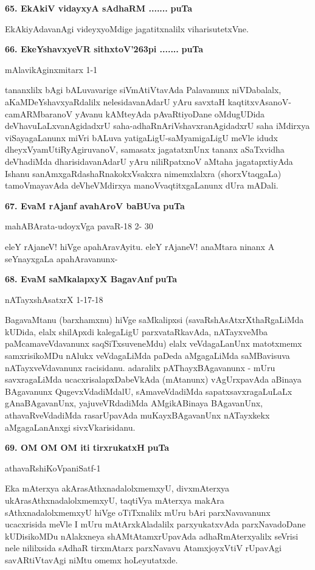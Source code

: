 \medskip
\noindent
\textbf{65. EkAkiV vidayxyA sAdhaRM .......} \hfill{\bf puTa }

\smallskip
EkAkiyAdavanAgi videyxyoMdige jagatitxnalilx viharisutetxVne.

\eject

\noindent
\textbf{66. EkeYshavxyeVR sithxtoV\char'263pi .......} \hfill{\bf puTa }

\hfill{mAlavikAginxmitarx 1-1}

\smallskip
tananxlilx bAgi bALuvavarige siVmAtiVtavAda Palavanunx niVDabalalx, aKaMDeYshavxyaRdalilx nelesidavanAdarU yAru savxtaH kaqtitxvAsanoV-camARMbaranoV yAvanu kAMteyAda pAvaRtiyoDane oMdugUDida deVhavuLaLxvanAgidadxrU saha-adhaRnAriVshavxranAgidadxrU saha iMdirxya viSayagaLanunx miVri bALuva yatigaLigU-saMyamigaLigU meVle idudx dheyxVyamUtiRyAgiruvanoV, samasatx jagatatxnUnx tananx aSaTxvidha deVhadiMda dharisidavanAdarU yAru niliRpatxnoV aMtaha jagatapxtiyAda Ishanu sanAmxgaRdashaRnakokxVsakxra nimemxlalxra (shorxVtaqgaLa) tamoVmayavAda deVheVMdirxya manoVvaqtitxgaLanunx dUra mADali.


\medskip
\noindent
\textbf{67. EvaM rAjanf avahAroV baBUva} \hfill{\bf puTa }

\hfill{mahABArata-udoyxVga pavaR-18 2- 30}

\smallskip
eleY rAjaneV! hiVge apahAravAyitu. eleY rAjaneV! anaMtara ninanx A seYnayxgaLa apahAravanunx-

\medskip
\noindent
\textbf{68. EvaM saMkalapxyX BagavAnf} \hfill{\bf puTa }

\hfill{nATayxshAsatxrX 1-17-18}

\smallskip
BagavaMtanu (barxhamxnu) hiVge saMkalipxsi (savaRshAsAtxrXthaRgaLiMda kUDida, elalx shilApxdi kalegaLigU parxvataRkavAda, nATayxveMba paMcamaveVdavanunx saqSiTxsuveneMdu) elalx veVdagaLanUnx matotxmemx samxrisikoMDu nAlukx veVdagaLiMda paDeda aMgagaLiMda saMBavisuva nATayxveVdavanunx racisidanu. adaralilx pAThayxBAgavanunx - mUru savxragaLiMda ucacxrisalapxDabeVkAda (mAtanunx) vAgUrxpavAda aBinaya BAgavanunx QugevxVdadiMdalU, sAmaveVdadiMda sapatxsavxragaLuLaLx gAnaBAgavanUnx, yajuveVRdadiMda AMgikABinaya BAgavanUnx, athavaRveVdadiMda rasarUpavAda muKayxBAgavanUnx nATayxkekx aMgagaLanAnxgi sivxVkarisidanu.


\smallskip
\noindent
\textbf{69. OM OM OM iti tirxrukatxH} \hfill{\bf puTa }

\hfill{athavaRshiKoVpaniSatf-1}

\smallskip
Eka mAterxya akArasAthxnadalolxmemxyU, divxmAterxya ukArasAthxnadalolxmemxyU, taqtiVya mAterxya makAra sAthxnadalolxmemxyU hiVge oTiTxnalilx mUru bAri parxNavavanunx ucacxrisida meVle I mUru mAtArxkAladalilx parxyukatxvAda parxNavadoDane kUDisikoMDu nAlakxneya shAMtAtamxrUpavAda adhaRmAterxyalilx seVrisi nele nililxsida sAdhaR tirxmAtarx parxNavavu AtamxjoyxVtiV rUpavAgi savARtiVtavAgi niMtu omemx hoLeyutatxde.

